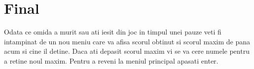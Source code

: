 \hypertarget{group__group__final}{}\section{Final}
\label{group__group__final}
Odata ce omida a murit sau ati iesit din joc in timpul unei pauze veti fi intampinat de un nou meniu care va afisa scorul obtinut si scorul maxim de pana acum si cine il detine. Daca ati depasit scorul maxim vi se va cere numele pentru a retine noul maxim. Pentru a reveni la meniul principal apasati enter. 